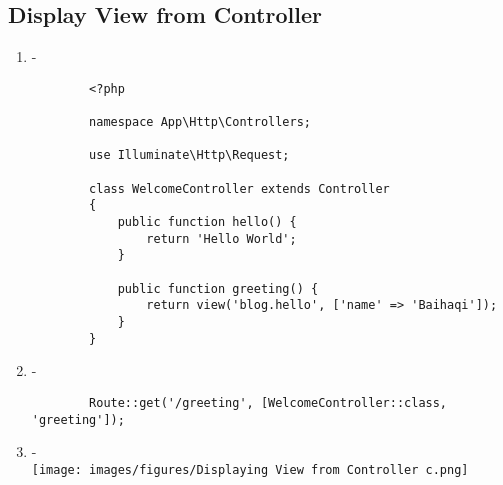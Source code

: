 \documentclass[12pt,titlepage]{article}
\begin{document}
\subsection{Display View from Controller}
\begin{enumerate}[label=\alph*.]
    \item -
    \begin{verbatim}
        <?php

        namespace App\Http\Controllers;
        
        use Illuminate\Http\Request;
        
        class WelcomeController extends Controller
        {
            public function hello() {
                return 'Hello World';
            }
        
            public function greeting() {
                return view('blog.hello', ['name' => 'Baihaqi']);
            }
        }
    \end{verbatim}
    \item -
    \begin{verbatim}
        Route::get('/greeting', [WelcomeController::class, 'greeting']);
    \end{verbatim}
    \item - \\ \texttt{[image: images/figures/Displaying View from Controller c.png]}
\end{enumerate}
\end{document}
